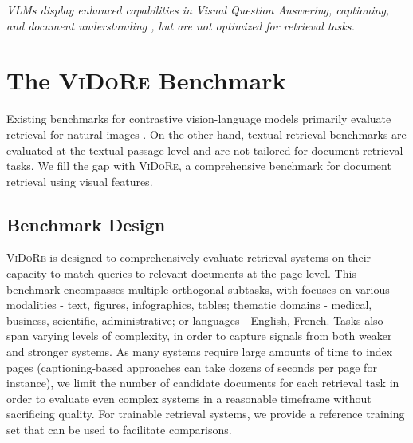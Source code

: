 \noindent\textit{VLMs display enhanced capabilities in Visual Question Answering, captioning, and document understanding , but are not optimized for retrieval tasks.}



\section{The \textsc{ViDoRe} Benchmark}
\label{section:docvis_benchmark}

Existing benchmarks for contrastive vision-language models primarily evaluate retrieval for natural images . On the other hand, textual retrieval benchmarks  are evaluated at the textual passage level and are not tailored for document retrieval tasks. We fill the gap with \textsc{ViDoRe}, a comprehensive benchmark for document retrieval using visual features.

\subsection{Benchmark Design}
\textsc{ViDoRe} is designed to comprehensively evaluate retrieval systems on their capacity to match queries to relevant documents at the page level. This benchmark encompasses multiple orthogonal subtasks, with focuses on various modalities - text, figures, infographics, tables; thematic domains - medical, business, scientific, administrative; or languages - English, French. Tasks also span varying levels of complexity, in order to capture signals from both weaker and stronger systems.  
As many systems require large amounts of time to index pages (captioning-based approaches can take dozens of seconds per page for instance), we limit the number of candidate documents for each retrieval task in order to evaluate even complex systems in a reasonable timeframe without sacrificing quality. For trainable retrieval systems, we provide a reference training set that can be used to facilitate comparisons.


